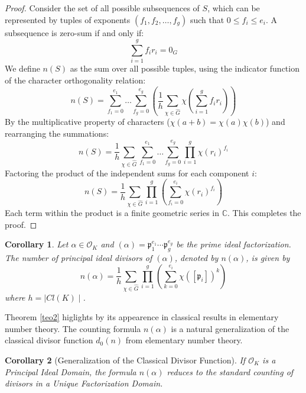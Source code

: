 \documentclass[11pt]{article}
\newtheorem{corollary}{Corollary}
\theoremstyle{definition}
\begin{document}
\begin{proof}
Consider the set of all possible subsequences of $S$, which can be represented by tuples of exponents $(f_1, f_2, \dots, f_g)$ such that $0 \le f_i \le e_i$. A subsequence is zero-sum if and only if:
\begin{equation}
    \sum_{i=1}^{g} f_i r_i = 0_G
\end{equation}
We define $n(S)$ as the sum over all possible tuples, using the indicator function of the character orthogonality relation:
\begin{equation}
    n(S) = \sum_{f_1=0}^{e_1} \dots \sum_{f_g=0}^{e_g} \left( \frac{1}{h} \sum_{\chi \in \hat{G}} \chi \left( \sum_{i=1}^{g} f_i r_i \right) \right)
\end{equation}
By the multiplicative property of characters ($\chi(a+b) = \chi(a)\chi(b)$) and rearranging the summations:
\begin{equation}
    n(S) = \frac{1}{h} \sum_{\chi \in \hat{G}} \sum_{f_1=0}^{e_1} \dots \sum_{f_g=0}^{e_g} \prod_{i=1}^{g} \chi(r_i)^{f_i}
\end{equation}
Factoring the product of the independent sums for each component $i$:
\begin{equation}
    n(S) = \frac{1}{h} \sum_{\chi \in \hat{G}} \prod_{i=1}^{g} \left( \sum_{f_i=0}^{e_i} \chi(r_i)^{f_i} \right)
\end{equation}
Each term within the product is a finite geometric series in $\mathbb{C}$. This completes the proof.
\end{proof}


\begin{corollary}
Let $\alpha \in \mathcal{O}_K$ and $(\alpha) = \mathfrak{p}_1^{e_1} \cdots \mathfrak{p}_g^{e_g}$ be the prime ideal factorization. The number of principal ideal divisors of $(\alpha)$, denoted by $n(\alpha)$, is given by
\begin{equation}
    n(\alpha) = \frac{1}{h} \sum_{\chi \in \hat{G}} \prod_{i=1}^{g}\left( \sum_{k=0}^{e_i} \chi([\mathfrak{p}_i])^k \right)
\end{equation}
where $h=\mid Cl(K)\mid$.
\end{corollary}
Theorem \ref{teo2} higlights by its appearence in classical results in elementary number theory. The counting formula $n(\alpha)$ is a natural generalization of the classical divisor function $d_0(n)$ from elementary number theory.




\begin{corollary}[Generalization of the Classical Divisor Function]
If $\mathcal{O}_K$ is a Principal Ideal Domain, the formula $n(\alpha)$ reduces to the standard counting of divisors in a Unique Factorization Domain.
\end{corollary}
\end{document}

